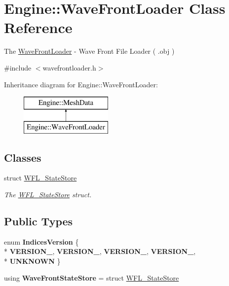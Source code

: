 \hypertarget{classEngine_1_1WaveFrontLoader}{}\section{Engine\+:\+:Wave\+Front\+Loader Class Reference}
\label{classEngine_1_1WaveFrontLoader}


The \hyperlink{classEngine_1_1WaveFrontLoader}{Wave\+Front\+Loader} -\/ Wave Front File Loader ( .obj )  




{\ttfamily \#include $<$wavefrontloader.\+h$>$}

Inheritance diagram for Engine\+:\+:Wave\+Front\+Loader\+:\begin{figure}[H]
\begin{center}
\leavevmode
\includegraphics[height=2.000000cm]{classEngine_1_1WaveFrontLoader}
\end{center}
\end{figure}
\subsection*{Classes}
\begin{DoxyCompactItemize}
\item 
struct \hyperlink{structEngine_1_1WaveFrontLoader_1_1WFL__StateStore}{W\+F\+L\+\_\+\+State\+Store}
\begin{DoxyCompactList}\small\item\em The \hyperlink{structEngine_1_1WaveFrontLoader_1_1WFL__StateStore}{W\+F\+L\+\_\+\+State\+Store} struct. \end{DoxyCompactList}\end{DoxyCompactItemize}
\subsection*{Public Types}
\begin{DoxyCompactItemize}
\item 
\hypertarget{classEngine_1_1WaveFrontLoader_a8abea744668c99829a7a16a6ac9f38af}{}enum {\bfseries Indices\+Version} \{ \\*
{\bfseries V\+E\+R\+S\+I\+O\+N\+\_}, 
{\bfseries V\+E\+R\+S\+I\+O\+N\+\_}, 
{\bfseries V\+E\+R\+S\+I\+O\+N\+\_}, 
{\bfseries V\+E\+R\+S\+I\+O\+N\+\_}, 
\\*
{\bfseries U\+N\+K\+N\+O\+W\+N}
 \}\label{classEngine_1_1WaveFrontLoader_a8abea744668c99829a7a16a6ac9f38af}

\item 
\hypertarget{classEngine_1_1WaveFrontLoader_a6db5399202044369d5c11bd10eb9fd4c}{}using {\bfseries Wave\+Front\+State\+Store} = struct \hyperlink{structEngine_1_1WaveFrontLoader_1_1WFL__StateStore}{W\+F\+L\+\_\+\+State\+Store}\label{classEngine_1_1WaveFrontLoader_a6db5399202044369d5c11bd10eb9fd4c}

\end{DoxyCompactItemize}
